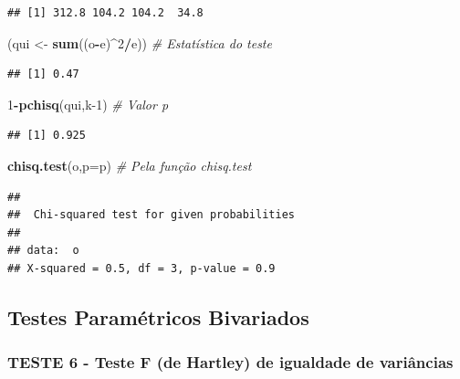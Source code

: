 \documentclass[
]{book}
\newenvironment{Shaded}{\begin{snugshade}}{\end{snugshade}}
\newcommand{\CommentTok}[1]{\textcolor[rgb]{0.56,0.35,0.01}{\textit{#1}}}
\newcommand{\DataTypeTok}[1]{\textcolor[rgb]{0.13,0.29,0.53}{#1}}
\newcommand{\DecValTok}[1]{\textcolor[rgb]{0.00,0.00,0.81}{#1}}
\newcommand{\KeywordTok}[1]{\textcolor[rgb]{0.13,0.29,0.53}{\textbf{#1}}}
\newcommand{\NormalTok}[1]{#1}
\newcommand{\OperatorTok}[1]{\textcolor[rgb]{0.81,0.36,0.00}{\textbf{#1}}}
\newcommand{\StringTok}[1]{\textcolor[rgb]{0.31,0.60,0.02}{#1}}
\theoremstyle{definition}
\theoremstyle{definition}
\theoremstyle{definition}
\theoremstyle{remark}
\begin{document}
\begin{verbatim}
## [1] 312.8 104.2 104.2  34.8
\end{verbatim}

\begin{Shaded}
\begin{Highlighting}[]
\NormalTok{(qui \textless{}{-}}\StringTok{ }\KeywordTok{sum}\NormalTok{((o}\OperatorTok{{-}}\NormalTok{e)}\OperatorTok{\^{}}\DecValTok{2}\OperatorTok{/}\NormalTok{e))     }\CommentTok{\# Estatística do teste}
\end{Highlighting}
\end{Shaded}

\begin{verbatim}
## [1] 0.47
\end{verbatim}

\begin{Shaded}
\begin{Highlighting}[]
\DecValTok{1}\OperatorTok{{-}}\KeywordTok{pchisq}\NormalTok{(qui,k}\DecValTok{{-}1}\NormalTok{)           }\CommentTok{\# Valor p}
\end{Highlighting}
\end{Shaded}

\begin{verbatim}
## [1] 0.925
\end{verbatim}

\begin{Shaded}
\begin{Highlighting}[]
\KeywordTok{chisq.test}\NormalTok{(o,}\DataTypeTok{p=}\NormalTok{p)           }\CommentTok{\# Pela função \textquotesingle{}chisq.test\textquotesingle{}}
\end{Highlighting}
\end{Shaded}

\begin{verbatim}
## 
##  Chi-squared test for given probabilities
## 
## data:  o
## X-squared = 0.5, df = 3, p-value = 0.9
\end{verbatim}

\hypertarget{testes-paramuxe9tricos-bivariados}{%
\subsection{Testes Paramétricos Bivariados}\label{testes-paramuxe9tricos-bivariados}}

\hypertarget{teste-6---teste-f-de-hartley-de-igualdade-de-variuxe2ncias}{%
\subsubsection*{TESTE 6 - Teste F (de Hartley) de igualdade de variâncias}\label{teste-6---teste-f-de-hartley-de-igualdade-de-variuxe2ncias}}
\end{document}
